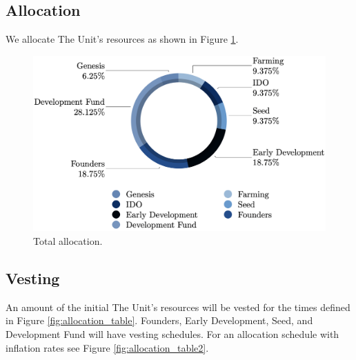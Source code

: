 \documentclass[12pt]{article}
\begin{document}
\subsection{Allocation}

We allocate The Unit's resources as shown in Figure \ref{fig:allocation}. 

\begin{figure}[h!]
\centering
  \includegraphics[width=5in]{images/The_Unit_Allocation.png}
  \caption{Total allocation.}
  \label{fig:allocation}
\end{figure}



\subsection{Vesting}

An amount of the initial The Unit's resources will be vested for the times defined in Figure \ref{fig:allocation_table}. Founders, Early Development, Seed, and Development Fund will have vesting schedules. For an allocation schedule with inflation rates see Figure \ref{fig:allocation_table2}.
\end{document}
